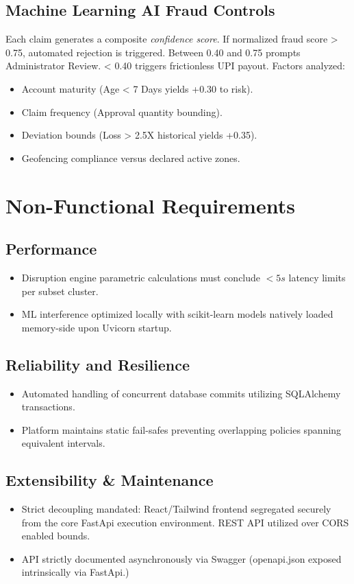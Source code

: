\documentclass[12pt,a4paper]{article}
\begin{document}
\subsection{Machine Learning AI Fraud Controls}
Each claim generates a composite \textit{confidence score}. If normalized fraud score > 0.75, automated rejection is triggered. Between 0.40 and 0.75 prompts Administrator Review. < 0.40 triggers frictionless UPI payout.
Factors analyzed:
\begin{itemize}
    \item Account maturity (Age < 7 Days yields +0.30 to risk).
    \item Claim frequency (Approval quantity bounding).
    \item Deviation bounds (Loss > 2.5X historical yields +0.35).
    \item Geofencing compliance versus declared active zones.
\end{itemize}

\section{Non-Functional Requirements}

\subsection{Performance}
\begin{itemize}
    \item Disruption engine parametric calculations must conclude $< 5s$ latency limits per subset cluster.
    \item ML interference optimized locally with scikit-learn models natively loaded memory-side upon Uvicorn startup.
\end{itemize}

\subsection{Reliability and Resilience}
\begin{itemize}
    \item Automated handling of concurrent database commits utilizing SQLAlchemy transactions.
    \item Platform maintains static fail-safes preventing overlapping policies spanning equivalent intervals.
\end{itemize}

\subsection{Extensibility \& Maintenance}
\begin{itemize}
    \item Strict decoupling mandated: React/Tailwind frontend segregated securely from the core FastApi execution environment. REST API utilized over CORS enabled bounds.
    \item API strictly documented asynchronously via Swagger (openapi.json exposed intrinsically via FastApi.)
\end{itemize}
\end{document}

